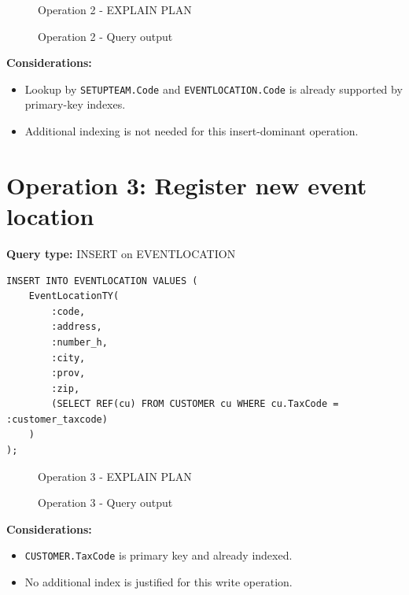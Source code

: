 \begin{figure}[H]
    \centering
    \caption{Operation 2 - EXPLAIN PLAN}
\end{figure}

\begin{figure}[H]
    \centering
    \caption{Operation 2 - Query output}
\end{figure}

\textbf{Considerations:}
\begin{itemize}
    \item Lookup by \texttt{SETUPTEAM.Code} and \texttt{EVENTLOCATION.Code} is already supported by primary-key indexes.
    \item Additional indexing is not needed for this insert-dominant operation.
\end{itemize}

\section{Operation 3: Register new event location}

\textbf{Query type:} INSERT on EVENTLOCATION

\begin{lstlisting}
INSERT INTO EVENTLOCATION VALUES (
    EventLocationTY(
        :code,
        :address,
        :number_h,
        :city,
        :prov,
        :zip,
        (SELECT REF(cu) FROM CUSTOMER cu WHERE cu.TaxCode = :customer_taxcode)
    )
);
\end{lstlisting}

\begin{figure}[H]
    \centering
    \caption{Operation 3 - EXPLAIN PLAN}
\end{figure}

\begin{figure}[H]
    \centering
    \caption{Operation 3 - Query output}
\end{figure}

\textbf{Considerations:}
\begin{itemize}
    \item \texttt{CUSTOMER.TaxCode} is primary key and already indexed.
    \item No additional index is justified for this write operation.
\end{itemize}

